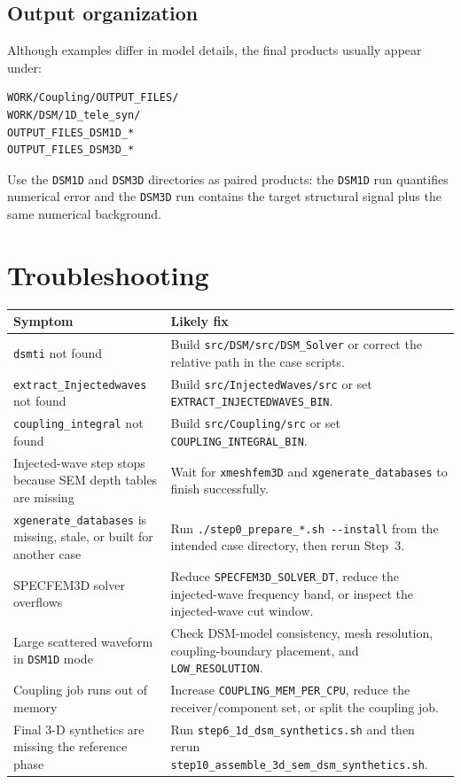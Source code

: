 \documentclass[11pt,oneside]{book}
\DeclareRobustCommand{\code}[1]{\nolinkurl{#1}}
\begin{document}
\section{Output organization}

Although examples differ in model details, the final products usually appear
under:
\begin{lstlisting}
WORK/Coupling/OUTPUT_FILES/
WORK/DSM/1D_tele_syn/
OUTPUT_FILES_DSM1D_*
OUTPUT_FILES_DSM3D_*
\end{lstlisting}
Use the \code{DSM1D} and \code{DSM3D} directories as paired products: the
\code{DSM1D} run quantifies numerical error and the \code{DSM3D} run contains
the target structural signal plus the same numerical background.

\backmatter
\chapter{Troubleshooting}

\begin{longtable}{L{0.32\textwidth}L{0.58\textwidth}}
\toprule
Symptom & Likely fix \\
\midrule
\code{dsmti} not found & Build \code{src/DSM/src/DSM_Solver} or correct the
relative path in the case scripts. \\
\code{extract_Injectedwaves} not found & Build \code{src/InjectedWaves/src}
or set \code{EXTRACT_INJECTEDWAVES_BIN}. \\
\code{coupling_integral} not found & Build \code{src/Coupling/src} or set
\code{COUPLING_INTEGRAL_BIN}. \\
Injected-wave step stops because SEM depth tables are missing & Wait for
\code{xmeshfem3D} and \code{xgenerate_databases} to finish successfully. \\
\code{xgenerate_databases} is missing, stale, or built for another case & Run
\code{./step0_prepare_*.sh --install} from the intended case directory, then
rerun Step~3. \\
SPECFEM3D solver overflows & Reduce \code{SPECFEM3D_SOLVER_DT}, reduce the
injected-wave frequency band, or inspect the injected-wave cut window. \\
Large scattered waveform in \code{DSM1D} mode & Check DSM-model consistency,
mesh resolution, coupling-boundary placement, and \code{LOW_RESOLUTION}. \\
Coupling job runs out of memory & Increase \code{COUPLING_MEM_PER_CPU}, reduce
the receiver/component set, or split the coupling job. \\
Final 3-D synthetics are missing the reference phase & Run
\code{step6_1d_dsm_synthetics.sh} and then rerun
\code{step10_assemble_3d_sem_dsm_synthetics.sh}. \\
\bottomrule
\end{longtable}
\end{document}
